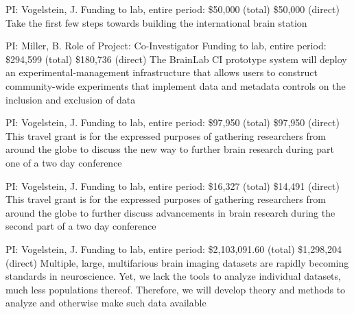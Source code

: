 \documentclass[10pt,colorlinks=true,urlcolor=blue]{moderncv}
\begin{document}
{\newline PI: Vogelstein, J.
\newline Funding to lab, entire period: \$50,000 (total) \$50,000 (direct)
\newline Take the first few steps towards building the international brain station}{}{}{}{}

{\newline PI: Miller, B.
\newline Role of Project: Co-Investigator
\newline Funding to lab, entire period: \$294,599 (total) \$180,736 (direct)
\newline The BrainLab CI prototype system will deploy an experimental-management
infrastructure that allows users to construct community-wide experiments that implement
data and metadata controls on the inclusion and exclusion of data}{}{}{}

{\newline PI: Vogelstein, J.
\newline Funding to lab, entire period: \$97,950 (total) \$97,950 (direct)
\newline This travel grant is for the expressed purposes of gathering researchers from around the
globe to discuss the new way to further brain research during part one of a two day
conference}{}{}{}

{\newline PI: Vogelstein, J.
\newline Funding to lab, entire period: \$16,327 (total) \$14,491 (direct)
\newline This travel grant is for the expressed purposes of gathering researchers from
around the globe to further discuss advancements in brain research during the
second part of a two day conference}{}{}{}

{\newline PI: Vogelstein, J.
\newline Funding to lab, entire period: \$2,103,091.60 (total) \$1,298,204 (direct)
\newline Multiple, large, multifarious brain imaging datasets are rapidly becoming standards in
neuroscience. Yet, we lack the tools to analyze individual datasets, much less
populations thereof. Therefore, we will develop theory and methods to analyze and
otherwise make such data available}{}{}{}
\end{document}
